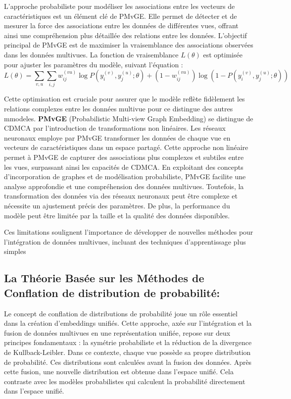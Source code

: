             L'approche probabiliste pour modéliser les associations entre les vecteurs de caractéristiques est un élément clé de PMvGE. Elle permet de détecter et de mesurer la force des associations entre les données de différentes vues, offrant ainsi une compréhension plus détaillée des relations entre les données. L'objectif principal de PMvGE est de maximiser la vraisemblance des associations observées dans les données multivues. La fonction de vraisemblance \( L(\theta) \) est optimisée pour ajuster les paramètres du modèle, suivant l'équation :
            \begin{equation}
                 L(\theta) = \sum_{v,u} \sum_{i,j} w_{ij}^{(vu)} \log P(y_i^{(v)}, y_j^{(u)}; \theta) + (1 - w_{ij}^{(vu)}) \log (1 - P(y_i^{(v)}, y_j^{(u)}; \theta)) 
            \end{equation}
        
        Cette optimisation est cruciale pour assurer que le modèle reflète fidèlement les relations complexes entre les données multivue pour ce distingue des autres mmodeles. \textbf{PMvGE} (Probabilistic Multi-view Graph Embedding) se distingue de CDMCA par l'introduction de transformations non linéaires. Les réseaux neuronaux employe par  PMvGE transformer les données de chaque vue en vecteurs de caractéristiques dans un espace partagé. Cette approche non linéaire permet à PMvGE de capturer des associations plus complexes et subtiles entre les vues, surpassant ainsi les capacités de CDMCA.
        En exploitant des concepts d'incorporation de graphes et de modélisation probabiliste, PMvGE facilite une analyse approfondie et une compréhension des données multivues. Toutefois, la transformation des données via des réseaux neuronaux peut être complexe et nécessite un ajustement précis des paramètres. De plus, la performance du modèle peut être limitée par la taille et la qualité des données disponibles.
        
        Ces limitations soulignent l'importance de développer de nouvelles méthodes pour l'intégration de données multivues, incluant des techniques d'apprentissage plus simples 

        \subsection{La Théorie Basée sur les Méthodes de Conflation de distribution de probabilité:}
        Le concept de conflation de distributions de probabilité joue un rôle essentiel dans la création d'embeddings unifiés. Cette approche, axée sur l'intégration et la fusion de données multivues en une représentation unifiée, repose sur deux principes fondamentaux : la symétrie probabiliste et la réduction de la divergence de Kullback-Leibler. Dans ce contexte, chaque vue possède sa propre distribution de probabilité. Ces distributions sont calculées avant la fusion des données. Après cette fusion, une nouvelle distribution est obtenue dans l'espace unifié. Cela contraste avec les modèles probabilistes qui calculent la probabilité directement dans l'espace unifié.
        
